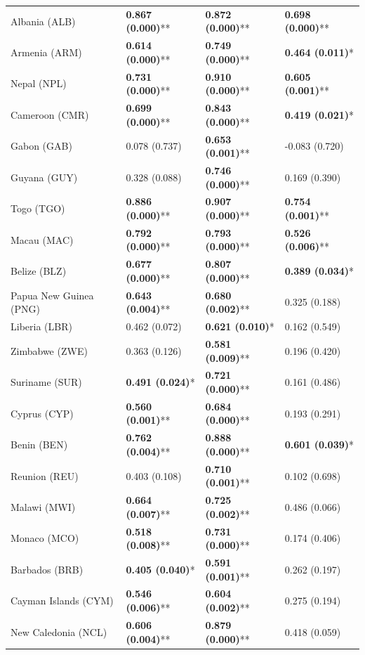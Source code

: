 \begin{longtable}{p{4cm}p{3cm}p{3cm}p{3cm}}
Albania (ALB) & \textbf{0.867 (0.000)}** & \textbf{0.872 (0.000)}** & \textbf{0.698 (0.000)}** \\
Armenia (ARM) & \textbf{0.614 (0.000)}** & \textbf{0.749 (0.000)}** & \textbf{0.464 (0.011)}* \\
Nepal (NPL) & \textbf{0.731 (0.000)}** & \textbf{0.910 (0.000)}** & \textbf{0.605 (0.001)}** \\
Cameroon (CMR) & \textbf{0.699 (0.000)}** & \textbf{0.843 (0.000)}** & \textbf{0.419 (0.021)}* \\
Gabon (GAB) & 0.078 (0.737) & \textbf{0.653 (0.001)}** & -0.083 (0.720) \\
Guyana (GUY) & 0.328 (0.088) & \textbf{0.746 (0.000)}** & 0.169 (0.390) \\
Togo (TGO) & \textbf{0.886 (0.000)}** & \textbf{0.907 (0.000)}** & \textbf{0.754 (0.001)}** \\
Macau (MAC) & \textbf{0.792 (0.000)}** & \textbf{0.793 (0.000)}** & \textbf{0.526 (0.006)}** \\
Belize (BLZ) & \textbf{0.677 (0.000)}** & \textbf{0.807 (0.000)}** & \textbf{0.389 (0.034)}* \\
Papua New Guinea (PNG) & \textbf{0.643 (0.004)}** & \textbf{0.680 (0.002)}** & 0.325 (0.188) \\
Liberia (LBR) & 0.462 (0.072) & \textbf{0.621 (0.010)}* & 0.162 (0.549) \\
Zimbabwe (ZWE) & 0.363 (0.126) & \textbf{0.581 (0.009)}** & 0.196 (0.420) \\
Suriname (SUR) & \textbf{0.491 (0.024)}* & \textbf{0.721 (0.000)}** & 0.161 (0.486) \\
Cyprus (CYP) & \textbf{0.560 (0.001)}** & \textbf{0.684 (0.000)}** & 0.193 (0.291) \\
Benin (BEN) & \textbf{0.762 (0.004)}** & \textbf{0.888 (0.000)}** & \textbf{0.601 (0.039)}* \\
Reunion (REU) & 0.403 (0.108) & \textbf{0.710 (0.001)}** & 0.102 (0.698) \\
Malawi (MWI) & \textbf{0.664 (0.007)}** & \textbf{0.725 (0.002)}** & 0.486 (0.066) \\
Monaco (MCO) & \textbf{0.518 (0.008)}** & \textbf{0.731 (0.000)}** & 0.174 (0.406) \\
Barbados (BRB) & \textbf{0.405 (0.040)}* & \textbf{0.591 (0.001)}** & 0.262 (0.197) \\
Cayman Islands (CYM) & \textbf{0.546 (0.006)}** & \textbf{0.604 (0.002)}** & 0.275 (0.194) \\
New Caledonia (NCL) & \textbf{0.606 (0.004)}** & \textbf{0.879 (0.000)}** & 0.418 (0.059) \\

\end{longtable}
